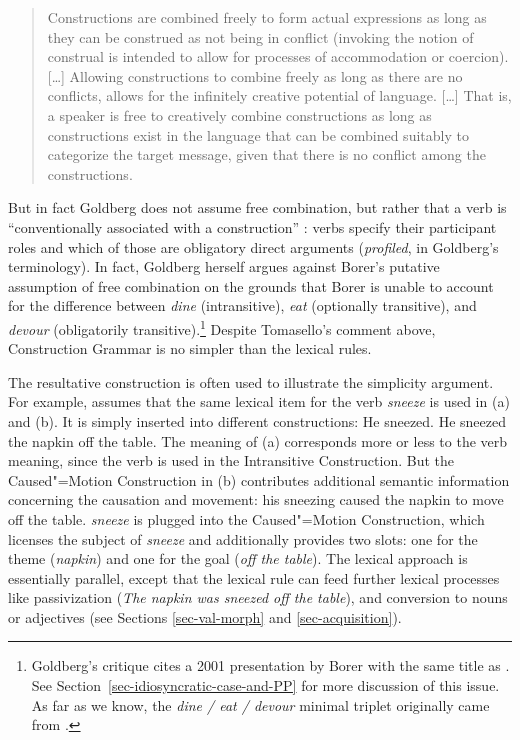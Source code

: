 \begin{quote}
Constructions are combined freely to form actual expressions as long
as they can be construed as not being in conflict (invoking the notion
of construal is intended to allow for processes of accommodation or
coercion). [\ldots]
Allowing constructions to combine freely as long as there are no
conflicts, allows for the infinitely creative potential of language.
[\ldots] That is, a speaker is free to creatively combine constructions as
long as constructions exist in the language that can be combined
suitably to categorize the target message, given that there is no
conflict among the constructions.  \citep[]{Goldberg2006a} 
\end{quote}

\noindent
But in fact Goldberg does not assume free combination, but rather that a verb is ``conventionally
associated with a construction'' \citep[]{Goldberg95a}: verbs specify their participant roles and which
of those are obligatory direct arguments (\emph{profiled}, in Goldberg's terminology).  In fact, Goldberg herself \citeyearpar[]{Goldberg2006a}
argues against Borer's putative assumption of free combination \citeyearpar{Borer2003a-u} on the grounds that Borer is
unable to account for the difference between \emph{dine} (intransitive), \emph{eat} (optionally
transitive), and \emph{devour} (obligatorily transitive).\footnote{%
  Goldberg's critique cites a 2001 presentation by Borer with the same title as .  See
  Section~\ref{sec-idiosyncratic-case-and-PP} for more discussion of this issue.  As far as
we know, the \emph{dine / eat / devour} minimal triplet originally came from \citet[--90]{Dowty89b-u}. }
Despite Tomasello's comment above,
Construction Grammar is no simpler than the lexical rules.   

The resultative construction is often used to illustrate the simplicity argument.  For example,  
\citet[Chapter~7]{Goldberg95a} assumes that the same lexical item for the verb \emph{sneeze}
is used in (a) and (b). It is simply inserted into different constructions:
\eal
\ex He sneezed.
\ex He sneezed the napkin off the table.
\zl
The meaning of (a) corresponds more or less to the verb meaning, since the verb is used in
the Intransitive Construction. But the Caused"=Motion Construction in (b) contributes
additional semantic information concerning the causation and movement: his sneezing caused the
napkin to move off the table.  \emph{sneeze} is plugged into the Caused"=Motion Construction, which
licenses the subject of \emph{sneeze} and additionally provides two slots: one for the theme
(\emph{napkin}) and one for the goal (\emph{off the table}).  The lexical approach is essentially parallel,
except that the lexical rule can feed further lexical processes like passivization (\emph{The napkin
  was sneezed off the table}), and conversion to nouns or adjectives (see Sections
\ref{sec-val-morph} and \ref{sec-acquisition}).   

